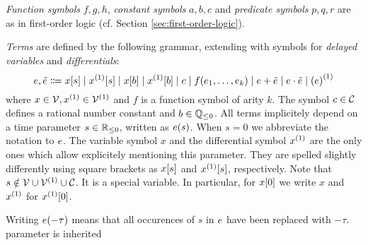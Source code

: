     \emph{Function symbols} $f,g,h$, \emph{constant symbols} $a,b,c$ and \emph{predicate symbols} $p,q,r$ are as in first-order logic (cf. Section \ref{sec:first-order-logic}).


    \begin{definition}[Terms]\label{def:syntax-terms}
        \emph{Terms} are defined by the following grammar, extending \dL with symbols for \emph{delayed variables} and \emph{differentials}:
        \begin{equation*}
            \astrm,\bstrm \Coloneqq
                \xtau[s] \mid
                \Dxtau[s] \mid
                \xtau[b] \mid
                \Dxtau[b] \mid
                c \mid
                f(\range{\istrm{1}}{\istrm{k}}) \mid
                \astrm + \bstrm \mid
                \astrm \cdot \bstrm \mid
                \D{(\astrm)}
        \end{equation*}
        where $x\in\allvars,\D{x}\in\diffvars$ and $f$ is a function symbol of arity $k$.
        The symbol $c\in\mathcal{C}_{}$ defines a rational number constant and $b\in\mathbb{Q}_{\leq 0}$.
        All terms implicitely depend on a time parameter $s\in\mathbb{R}_{\leq 0}$, written as $e(s)$. When $s=0$ we abbreviate the notation to $e$.
        The variable symbol $x$ and the differential symbol $\D{x}$ are the only ones which allow explicitely mentioning this parameter. They are spelled slightly differently using square brackets as $x[s]$ and $\Dxtau[s]$, respectively. Note that $s\notin\allvars\cup\diffvars\cup\constants$. It is a special variable.
        In particular, for $x[0]$ we write $x$ and $\D{x}$ for $\Dxtau[0]$.

        Writing $e(-\tau)$ means that all occurences of $s$ in $e$ have been replaced with $-\tau$.
        parameter is inherited


    \end{definition}

